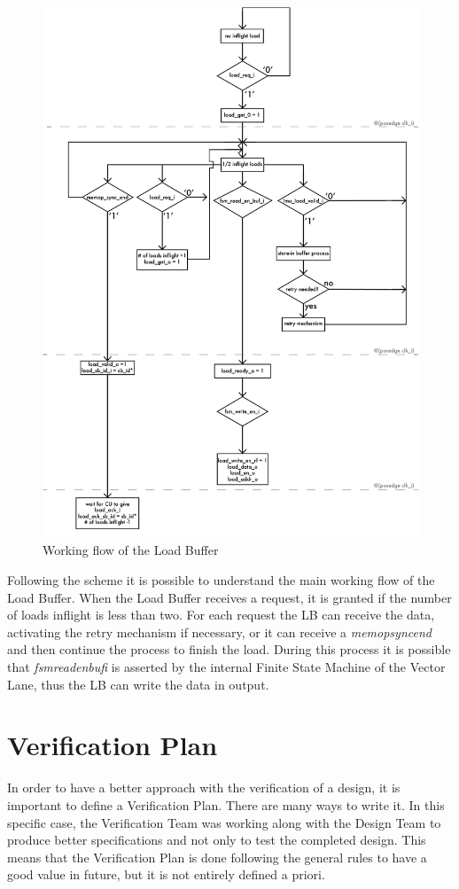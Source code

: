 \newpage
\begin{figure}[H]
    \centering
    \includegraphics[scale = 0.8]{Chapter_2/img/lb-flow.png}
    \caption{Working flow of the Load Buffer}
    \label{lb-flow}
\end{figure}

Following the scheme it is possible to understand the main working flow of the Load Buffer.
When the Load Buffer receives a request, it is granted if the number of loads inflight is less than two.
For each request the LB can receive the data, activating the retry mechanism if necessary, or it can receive a \emph{memop\+sync\+end} and then continue the process to finish the load.
During this process it is possible that \emph{fsm\+read\+en\+buf\+i} is asserted by the internal Finite State Machine of the Vector Lane, thus the LB can write the data in output.


\section{Verification Plan}
In order to have a better approach with the verification of a design, it is important to define a Verification Plan.
There are many ways to write it. In this specific case, the Verification Team was working along with the Design Team to produce better specifications and not only to test the completed design. This means that the Verification Plan is done following the general rules to have a good value in future, but it is not entirely defined a priori.

